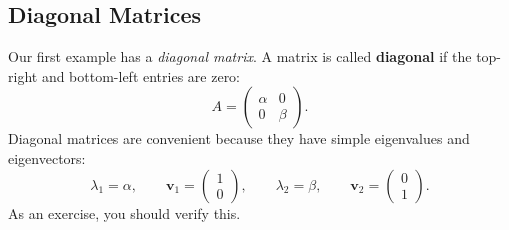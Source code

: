 \documentclass[11pt,letterpaper]{article}
\begin{document}

\subsection{Diagonal Matrices}

Our first example has a \textit{diagonal matrix}. A matrix is called \textbf{diagonal}
if the top-right and bottom-left entries are zero:
\[
    A=
    \begin{pmatrix}
        \alpha&0\\
        0&\beta
    \end{pmatrix}.
\]
Diagonal matrices are convenient because they have simple eigenvalues and eigenvectors:
\[
    \lambda_1=\alpha,\qquad
    \mathbf{v}_1=\begin{pmatrix}1\\0\end{pmatrix},
    \qquad
    \lambda_2=\beta,\qquad
    \mathbf{v}_2=\begin{pmatrix}0\\1\end{pmatrix}.
\]
As an exercise, you should verify this. 

\end{document}

